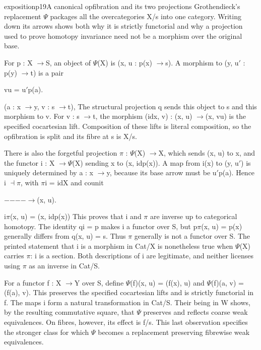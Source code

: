 \begin{dcomment}{exposition}{p19}{A canonical opfibration and its two projections}
Grothendieck’s replacement \ensuremath{\Psi} packages all the overcategories X/s into one category. Writing down its arrows shows both why it is strictly functorial and why a projection used to prove homotopy invariance need not be a morphism over the original base.

For p : X \ensuremath{\to}S, an object of \ensuremath{\Psi}(X) is (x, u : p(x) \ensuremath{\to}s). A morphism to (y, u\ensuremath{\prime} : p(y) \ensuremath{\to}t) is a pair

vu = u\ensuremath{\prime}p(a).

(a : x \ensuremath{\to}y, v : s \ensuremath{\to}t), The structural projection q sends this object to s and this morphism to v. For v : s \ensuremath{\to}t, the morphism (idx, v) : (x, u) \ensuremath{\to}(x, vu) is the specified cocartesian lift. Composition of these lifts is literal composition, so the opfibration is split and its fibre at s is X/s.

There is also the forgetful projection \ensuremath{\pi} : \ensuremath{\Psi}(X) \ensuremath{\to}X, which sends (x, u) to x, and the functor i : X \ensuremath{\to}\ensuremath{\Psi}(X) sending x to (x, idp(x)). A map from i(x) to (y, u\ensuremath{\prime}) is uniquely determined by a : x \ensuremath{\to}y, because its base arrow must be u\ensuremath{\prime}p(a). Hence i \ensuremath{\dashv}\ensuremath{\pi}, with \ensuremath{\pi}i = idX and counit

\ensuremath{-}\ensuremath{-}\ensuremath{-}\ensuremath{-}\ensuremath{\to}(x, u).

i\ensuremath{\pi}(x, u) = (x, idp(x)) This proves that i and \ensuremath{\pi} are inverse up to categorical homotopy. The identity qi = p makes i a functor over S, but p\ensuremath{\pi}(x, u) = p(x) generally differs from q(x, u) = s. Thus \ensuremath{\pi} generally is not a functor over S. The printed statement that i is a morphism in Cat/X is nonetheless true when \ensuremath{\Psi}(X) carries \ensuremath{\pi}: i is a section. Both descriptions of i are legitimate, and neither licenses using \ensuremath{\pi} as an inverse in Cat/S.

For a functor f : X \ensuremath{\to}Y over S, define \ensuremath{\Psi}(f)(x, u) = (f(x), u) and \ensuremath{\Psi}(f)(a, v) = (f(a), v). This preserves the specified cocartesian lifts and is strictly functorial in f. The maps i form a natural transformation in Cat/S. Their being in W shows, by the resulting commutative square, that \ensuremath{\Psi} preserves and reflects coarse weak equivalences. On fibres, however, its effect is f/s. This last observation specifies the stronger class for which \ensuremath{\Psi} becomes a replacement preserving fibrewise weak equivalences.

\end{dcomment}

